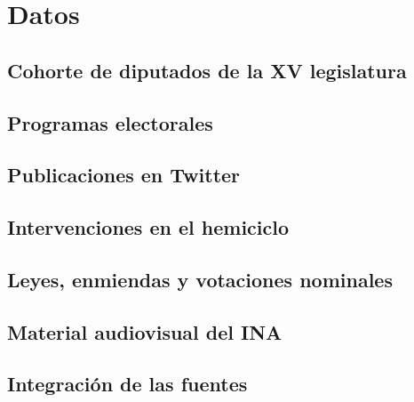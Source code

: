 \chapter{Datos}
\label{cap:datos}

\section{Cohorte de diputados de la XV legislatura}
\label{sec:cohorte}

\section{Programas electorales}
\label{sec:manifiestos}

\section{Publicaciones en Twitter}
\label{sec:twitter}

\section{Intervenciones en el hemiciclo}
\label{sec:hemiciclo}

\section{Leyes, enmiendas y votaciones nominales}
\label{sec:votos}

\section{Material audiovisual del INA}
\label{sec:ina}

\section{Integración de las fuentes}
\label{sec:integracion}

